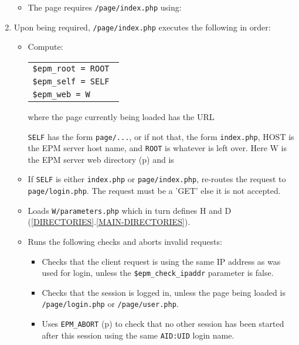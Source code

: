 \documentclass[12pt]{article}
\newcommand{\EOL}{\penalty \exhyphenpenalty}
\newcommand{\pagref}[1]{p\pageref{#1}}
\newcommand{\sref}[2]{(\ref{#1}.\ref{#2})}
\begin{document}
\begin{enumerate}
\begin{itemize}
\item The page requires {\tt /page/index.php} using:

      \hspace*{0.2in}{\tt require \_\_DIR\_\_ . '/index.php'}
      
\end{itemize}

\item Upon being required, {\tt /page/index.php} executes the
      following in order:
\begin{itemize}
\item Compute:

      \hspace*{0.2in}\begin{tabular}{l}
		\tt \$epm\_root = ROOT \\
		\tt \$epm\_self = SELF \\
		\tt \$epm\_web = W \\
		\end{tabular}

       where the page currently being loaded has the URL

       \hspace*{0.2in}{\tt http://HOST/ROOT/SELF}

       {\tt SELF} has the form {\tt page/...}, or if
       not that, the form {\tt index.php}, HOST is the
       EPM server host name, and {\tt ROOT} is whatever
       is left over.  Here W is the EPM server web directory
       (\pagref{W-DIRECTORY}) and is

       \hspace*{0.2in}{\tt \$\_SERVER['DOCUMENT\_ROOT'] . ROOT}

\item If {\tt SELF} is either {\tt index.php} or {\tt page/index.php},
      re-routes the request to {\tt page/\EOL login.php}.  The
      request must be a 'GET' else it is not accepted.

\item Loads {\tt W/parameters.php} which in turn defines H and D
      \sref{DIRECTORIES}{MAIN-DIRECTORIES}.

\item Runs the following checks and aborts invalid requests:
\begin{itemize}
\item Checks that the client request is using the same IP
address as was used for login, unless the {\tt \$epm\_check\_ipaddr}
parameter is false.
\item Checks that the session is logged in, unless the page being
loaded is {\tt /page/\EOL login.php} or {\tt /page/user.php}.
\item Uses {\tt EPM\_ABORT} (\pagref{EPM_ABORT}) to check that
no other session has been started after this session using the
same {\tt AID:UID} login name.
\end{itemize}


\end{itemize}
\end{enumerate}
\end{document}
